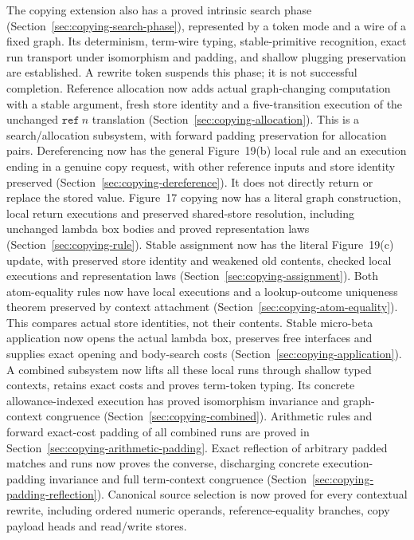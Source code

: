 The copying extension also has a proved intrinsic search phase
(Section~\ref{sec:copying-search-phase}), represented by a token mode and a wire
of a fixed graph. Its determinism, term-wire typing, stable-primitive recognition,
exact run transport under isomorphism and padding, and shallow plugging
preservation are established. A rewrite token suspends this phase; it is not
successful completion. Reference allocation now adds actual graph-changing computation with a stable
argument, fresh store identity and a five-transition execution of the unchanged
$\mathtt{ref}\ n$ translation (Section~\ref{sec:copying-allocation}). This is a
search/allocation subsystem, with forward padding preservation for allocation
pairs. Dereferencing now has the general Figure~19(b) local rule and an
execution ending in a genuine copy request, with other reference inputs and
store identity preserved (Section~\ref{sec:copying-dereference}). It does not
directly return or replace the stored value. Figure~17 copying now has a
literal graph construction, local return executions and preserved shared-store
resolution, including unchanged lambda box bodies and proved representation
laws (Section~\ref{sec:copying-rule}). Stable assignment now has the literal
Figure~19(c) update, with preserved store identity and weakened old contents,
checked local executions and representation laws
(Section~\ref{sec:copying-assignment}). Both atom-equality rules now have
local executions and a lookup-outcome uniqueness theorem preserved by context
attachment (Section~\ref{sec:copying-atom-equality}). This compares actual
store identities, not their contents. Stable micro-beta application now opens
the actual lambda box, preserves free interfaces and supplies exact opening
and body-search costs (Section~\ref{sec:copying-application}). A combined
subsystem now lifts all these local runs through shallow typed
contexts, retains exact costs and proves term-token typing. Its concrete
allowance-indexed execution has proved isomorphism invariance and graph-context
congruence (Section~\ref{sec:copying-combined}). Arithmetic rules and forward
exact-cost padding of all combined runs are proved in
Section~\ref{sec:copying-arithmetic-padding}. Exact reflection of arbitrary
padded matches and runs now proves the converse, discharging concrete
execution-padding invariance and full term-context congruence
(Section~\ref{sec:copying-padding-reflection}). Canonical source selection is
now proved for every contextual rewrite, including ordered numeric operands,
reference-equality branches, copy payload heads and read/write stores.
